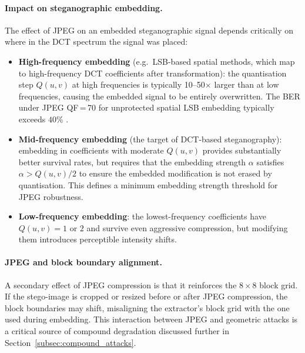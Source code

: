 \documentclass[12pt,a4paper,oneside]{report}
\begin{document}
	\paragraph{Impact on steganographic embedding.}
	The effect of JPEG on an embedded steganographic signal depends critically on where in the
	DCT spectrum the signal was placed:
	
	\begin{itemize}
		\item \textbf{High-frequency embedding} (e.g.\ LSB-based spatial methods, which map to
		high-frequency DCT coefficients after transformation): the quantisation step $Q(u,v)$
		at high frequencies is typically 10--50$\times$ larger than at low frequencies, causing
		the embedded signal to be entirely overwritten. The BER under JPEG QF\,=\,70 for
		unprotected spatial LSB embedding typically exceeds $40\%$ \cite{provos2003hide}.
		
		\item \textbf{Mid-frequency embedding} (the target of DCT-based steganography): embedding
		in coefficients with moderate $Q(u,v)$ provides substantially better survival rates,
		but requires that the embedding strength $\alpha$ satisfies $\alpha > Q(u,v)/2$ to
		ensure the embedded modification is not erased by quantisation. This defines a minimum
		embedding strength threshold for JPEG robustness.
		
		\item \textbf{Low-frequency embedding}: the lowest-frequency coefficients have $Q(u,v) = 1$
		or $2$ and survive even aggressive compression, but modifying them introduces perceptible
		intensity shifts.
	\end{itemize}
	
	\paragraph{JPEG and block boundary alignment.}
	A secondary effect of JPEG compression is that it reinforces the $8 \times 8$ block grid. If the
	stego-image is cropped or resized before or after JPEG compression, the block boundaries may
	shift, misaligning the extractor's block grid with the one used during embedding. This interaction
	between JPEG and geometric attacks is a critical source of compound degradation discussed
	further in Section~\ref{subsec:compound_attacks}.
	
\end{document}
